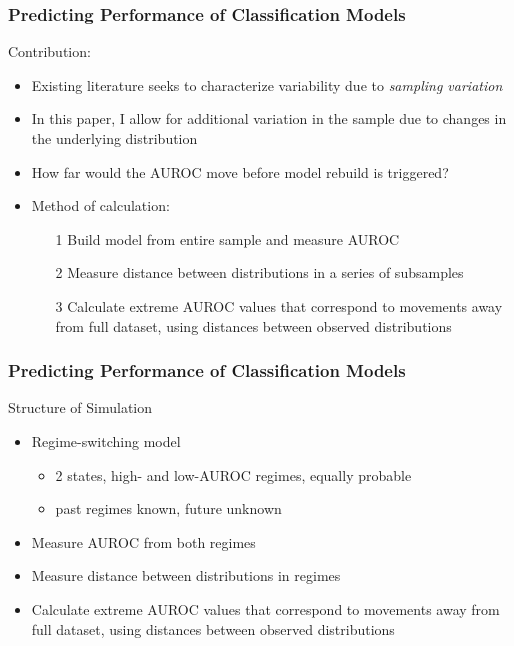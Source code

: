 \documentclass{beamer}
\begin{document}
\begin{frame}
\frametitle{Predicting Performance of Classification Models}

Contribution:
\begin{itemize}
    \item Existing literature seeks to characterize variability due to \emph{sampling variation}
    \item In this paper, I allow for additional variation in the sample due to changes in the underlying distribution
    \item How far would the AUROC move before model rebuild is triggered?
    \item Method of calculation:
    \begin{itemize}
        \item[1] Build model from entire sample and measure AUROC
        \item[2] Measure distance between distributions in a series of subsamples
        \item[3] Calculate extreme AUROC values that correspond to movements away from full dataset, using distances between observed distributions
    \end{itemize}
\end{itemize}

\end{frame}



\begin{frame}
\frametitle{Predicting Performance of Classification Models}

Structure of Simulation
\begin{itemize}
    \item Regime-switching model
    \begin{itemize}
        \item 2 states, high- and low-AUROC regimes, equally probable
        \item past regimes known, future unknown
    \end{itemize}
    \item Measure AUROC from both regimes
    \item Measure distance between distributions in regimes
    \item Calculate extreme AUROC values that correspond to movements away from full dataset, using distances between observed distributions
\end{itemize}

\end{frame}
\end{document}
